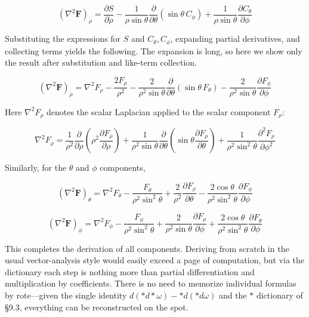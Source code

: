 \documentclass[a4paper,12pt,openany]{book}
\begin{document}
\[(\nabla^2\mathbf{F})_\rho = \frac{\partial S}{\partial\rho} - \frac{1}{\rho\sin\theta}\frac{\partial}{\partial\theta}(\sin\theta\,C_\phi) + \frac{1}{\rho\sin\theta}\frac{\partial C_\theta}{\partial\phi}\]

Substituting the expressions for \(S\) and \(C_\theta, C_\phi\),
expanding partial derivatives, and collecting terms yields the
following. The expansion is long, so here we show only the result after
substitution and like-term collection.

\[(\nabla^2\mathbf{F})_\rho = \nabla^2 F_\rho - \frac{2F_\rho}{\rho^2} - \frac{2}{\rho^2\sin\theta}\frac{\partial}{\partial\theta}(\sin\theta\,F_\theta) - \frac{2}{\rho^2\sin\theta}\frac{\partial F_\phi}{\partial\phi}\]

Here \(\nabla^2 F_\rho\) denotes the scalar Laplacian applied to the
scalar component \(F_\rho\):

\[\nabla^2 F_\rho = \frac{1}{\rho^2}\frac{\partial}{\partial\rho}\!\left(\rho^2\frac{\partial F_\rho}{\partial\rho}\right) + \frac{1}{\rho^2\sin\theta}\frac{\partial}{\partial\theta}\!\left(\sin\theta\frac{\partial F_\rho}{\partial\theta}\right) + \frac{1}{\rho^2\sin^2\theta}\frac{\partial^2 F_\rho}{\partial\phi^2}\]

Similarly, for the \(\theta\) and \(\phi\) components,

\[(\nabla^2\mathbf{F})_\theta = \nabla^2 F_\theta - \frac{F_\theta}{\rho^2\sin^2\theta} + \frac{2}{\rho^2}\frac{\partial F_\rho}{\partial\theta} - \frac{2\cos\theta}{\rho^2\sin^2\theta}\frac{\partial F_\phi}{\partial\phi}\]

\[(\nabla^2\mathbf{F})_\phi = \nabla^2 F_\phi - \frac{F_\phi}{\rho^2\sin^2\theta} + \frac{2}{\rho^2\sin\theta}\frac{\partial F_\rho}{\partial\phi} + \frac{2\cos\theta}{\rho^2\sin^2\theta}\frac{\partial F_\theta}{\partial\phi}\]

This completes the derivation of all components. Deriving from scratch
in the usual vector-analysis style would easily exceed a page of
computation, but via the dictionary each step is nothing more than
partial differentiation and multiplication by coefficients. There is no
need to memorize individual formulas by rote—given the single identity
\(d(\ast d\ast\omega)-\ast d(\ast d\omega)\) and the \(\ast\) dictionary
of §9.3, everything can be reconstructed on the spot.

\par\vspace{0.35em}\par
\end{document}
